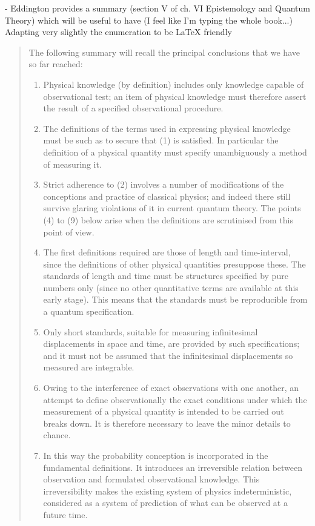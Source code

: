 \documentclass{article}
\begin{document}
- Eddington provides a summary (section V of ch. VI Epistemology and Quantum Theory) which will be useful to have (I feel like I'm typing the whole book...)  Adapting very slightly the enumeration to be LaTeX friendly

\begin{quote}
    The following summary will recall the principal conclusions that we have so far reached:
    \begin{enumerate}
        \item Physical knowledge (by definition) includes only knowledge capable of observational test; an item of physical knowledge must therefore assert the result of a specified observational procedure.
        \item The definitions of the terms used in expressing physical knowledge must be such as to secure that (1) is satisfied.  In particular the definition of a physical quantity must specify unambiguously a method of measuring it.  
        \item Strict adherence to (2) involves a number of modifications of the conceptions and practice of classical physics; and indeed there still survive glaring violations of it in current quantum theory.  The points (4) to (9) below arise when the definitions are scrutinised from this point of view.
        \item The first definitions required are those of length and time-interval, since the definitions of other physical quantities presuppose these.  The standards of length and time must be structures specified by pure numbers only (since no other quantitative terms are available at this early stage).  This means that the standards must be reproducible from a quantum specification.
        \item Only short standards, suitable for measuring infinitesimal displacements in space and time, are provided by such specifications; and it must not be assumed that the infinitesimal displacements so measured are integrable.
        \item Owing to the interference of exact observations with one another, an attempt to define observationally the exact conditions under which the measurement of a physical quantity is intended to be carried out breaks down.  It is therefore necessary to leave the minor details to chance.
        \item In this way the probability conception is incorporated in the fundamental definitions.  It introduces an irreversible relation between observation and formulated observational knowledge.  This irreversibility makes the existing system of physics indeterministic, considered as a system of prediction of what can be observed at a future time.

\end{enumerate}
\end{quote}
\end{document}

